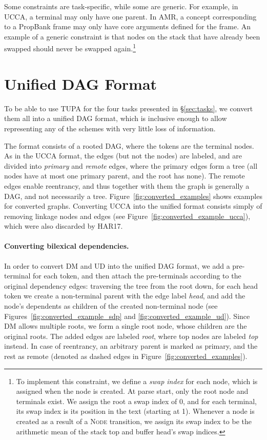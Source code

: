 \documentclass[11pt,a4paper]{article}
\begin{document}
Some constraints are task-specific, while some are generic.
For example, in UCCA, a terminal may only have one parent.
In AMR, a concept corresponding to a PropBank frame may only have 
core arguments defined for the frame.
An example of a generic constraint is that nodes on the stack 
that have already been swapped
should never be swapped again.\footnote{
	To implement this constraint, we define a \textit{swap index}
	for each node, which is assigned when the node is created.
	At parse start, only the root node and terminals exist.
	We assign the root a swap index of 0, and for each terminal, its swap index
	is its position in the text (starting at 1).
	Whenever a node is created as a result of a \textsc{Node}
	transition, we assign its swap index to be the arithmetic 
	mean of the stack top and buffer head's swap indices.}


\section{Unified DAG Format}\label{sec:conversion}

To be able to use TUPA for the four tasks presented in \S\ref{sec:tasks},
we convert them all into a unified DAG format, which is inclusive enough to
allow representing any of the schemes with very little loss of information.

The format consists of a rooted DAG, where the tokens are the terminal nodes.
As in the UCCA format, the edges (but not the nodes) are labeled,
and are divided into \textit{primary} and \textit{remote} edges,
where the primary edges form a tree (all nodes have at most one primary parent,
and the root has none).
The remote edges enable reentrancy, and thus together with them the graph
is generally a DAG, and not necessarily a tree.
Figure~\ref{fig:converted_examples} shows examples for converted graphs.
Converting UCCA into the unified format consists simply of removing linkage 
nodes and edges (see Figure~\ref{fig:converted_example_ucca}), which were
also discarded by HAR17.

\paragraph{Converting bilexical dependencies.}
In order to convert DM and UD into the unified DAG format,
we add a pre-terminal for each token,
and then attach the pre-terminals according to the original dependency edges:
traversing the tree from the root down, for each head token we create a non-terminal
parent with the edge label {\it head},
and add the node's dependents as children of the created non-terminal node
(see Figures~\ref{fig:converted_example_sdp} and \ref{fig:converted_example_ud}).
Since DM allows multiple roots, we form a single root node, whose children
are the original roots. The added edges are labeled \textit{root}, where
top nodes are labeled \textit{top} instead.
In case of reentrancy, an arbitrary parent is marked as primary, and the rest as remote
(denoted as dashed edges in Figure~\ref{fig:converted_examples}).
\end{document}
